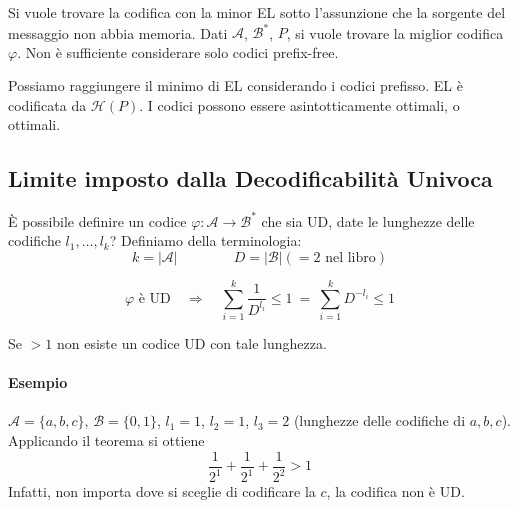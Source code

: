 Si vuole trovare la codifica con la minor EL sotto l'assunzione che la sorgente del messaggio non abbia memoria. Dati $\mathcal{A}$, $\mathcal{B}^*$, $P$, si vuole trovare la miglior codifica $\varphi$. Non è sufficiente considerare solo codici prefix-free.

Possiamo raggiungere il minimo di EL considerando i codici prefisso. EL è codificata da $\mathcal{H}(P)$. I codici possono essere asintotticamente ottimali, o ottimali.


\subsection{Limite imposto dalla Decodificabilità Univoca}

È possibile definire un codice $\varphi:\mathcal{A}\to\mathcal{B}^*$ che sia UD, date le lunghezze delle codifiche $l_1,\dots,l_k$? Definiamo della terminologia:
$$
    k=|\mathcal{A}| \qquad \qquad D=|\mathcal{B}|(=2\text{ nel libro})
$$

\begin{theorem}
    $$
        \varphi \text{ è UD}
        \quad \Rightarrow \quad
        \sum_{i=1}^k \frac{1}{D^{l_i}} \leq 1 ~ = ~ \sum_{i=1}^k D^{-l_i} \leq 1
    $$
\end{theorem}
Se $>1$ non esiste un codice UD con tale lunghezza.

\paragraph{Esempio} $\mathcal{A}=\{a,b,c\}$, $\mathcal{B}=\{0,1\}$, $l_1=1$, $l_2=1$, $l_3=2$ (lunghezze delle codifiche di $a,b,c$). Applicando il teorema si ottiene
$$
    \frac{1}{2^1}+\frac{1}{2^1}+\frac{1}{2^2} > 1
$$
Infatti, non importa dove si sceglie di codificare la $c$, la codifica non è UD.
\begin{center}
\end{center}


